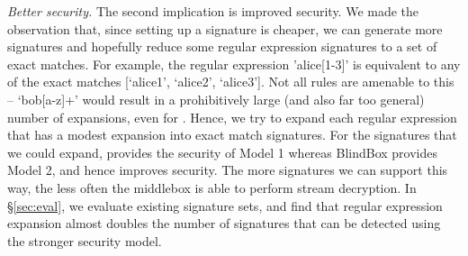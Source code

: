 \textit{Better security.}
The second implication is improved security. We made the observation that, since setting up a signature is cheaper, we can generate more signatures and hopefully reduce some regular expression signatures to a set of exact matches.  
For example, the regular expression 'alice[1-3]' is equivalent to any of the exact matches [`alice1', `alice2', `alice3']. 
Not all rules are amenable to this -- \eg{} `bob[a-z]+' would result in a prohibitively large (and also far too general) number of expansions, even for \sys. 
Hence, we try to expand each regular expression that has a modest expansion into exact match signatures. 
For the signatures that we could expand, \sys provides the security of Model 1 whereas BlindBox provides Model 2, and hence \sys improves security. 
The more signatures we can support this way, the less often the middlebox is able to perform stream decryption. 
In \S\ref{sec:eval}, we evaluate existing signature sets, and find that regular expression expansion almost doubles the number of signatures that can be detected using the stronger security model.





